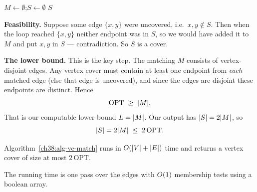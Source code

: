 \begin{algorithm}[H]
\caption{\textsc{VertexCover-Matching}$(\Gph=(V,E))$}\label{ch38:alg-vc-match}
\DontPrintSemicolon
$M \gets \emptyset$;\quad $S \gets \emptyset$\;
\Return $S$\;
\end{algorithm}

\begin{whybox}
\textbf{Feasibility.} Suppose some edge $\{x,y\}$ were uncovered, i.e.\ $x,y\notin S$. Then when the
loop reached $\{x,y\}$ neither endpoint was in $S$, so we would have added it to $M$ and put $x,y$ in
$S$ --- contradiction. So $S$ is a cover.

\textbf{The lower bound.} This is the key step. The matching $M$ consists of vertex-disjoint edges. Any
vertex cover must contain at least one endpoint from \emph{each} matched edge (else that edge is
uncovered), and since the edges are disjoint these endpoints are distinct. Hence
\[
  \mathrm{OPT} \;\ge\; \lvert M\rvert.
\]
That is our computable lower bound $L=\lvert M\rvert$. Our output has $\lvert S\rvert=2\lvert M\rvert$, so
\[
  \lvert S\rvert = 2\lvert M\rvert \;\le\; 2\,\mathrm{OPT}.
\]
\end{whybox}

\begin{theorem}\label{ch38:thm-vc2}
Algorithm~\ref{ch38:alg-vc-match} runs in $O(\lvert V\rvert+\lvert E\rvert)$ time and returns a vertex cover of size
at most $2\,\mathrm{OPT}$.
\end{theorem}

The running time is one pass over the edges with $O(1)$ membership tests using a boolean array.

